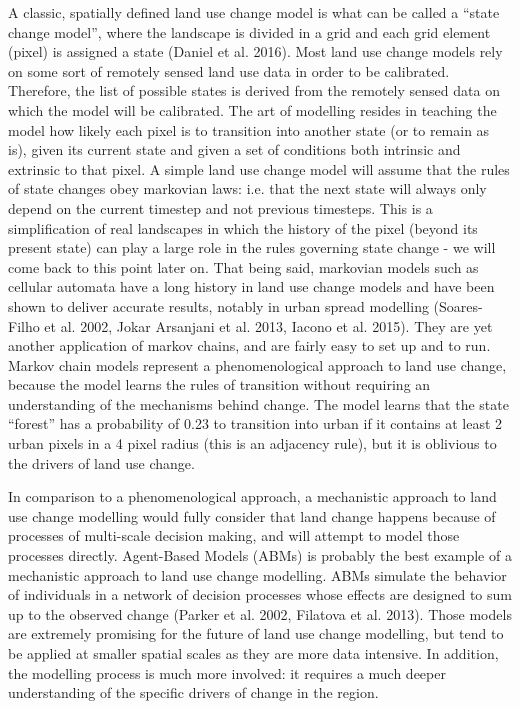 A classic, spatially defined land use change model is what can be called a “state change model”, where the landscape is divided in a grid and each grid element (pixel) is assigned a state (Daniel et al. 2016). Most land use change models rely on some sort of remotely sensed land use data in order to be calibrated. Therefore, the list of possible states is derived from the remotely sensed data on which the model will be calibrated. The art of modelling resides in teaching the model how likely each pixel is to transition into another state (or to remain as is), given its current state and given a set of conditions both intrinsic and extrinsic to that pixel. A simple land use change model will assume that the rules of state changes obey markovian laws: i.e. that the next state will always only depend on the current timestep and not previous timesteps. This is a simplification of real landscapes in which the history of the pixel (beyond its present state) can play a large role in the rules governing state change - we will come back to this point later on. That being said, markovian models such as cellular automata have a long history in land use change models and have been shown to deliver accurate results, notably in urban spread modelling (Soares-Filho et al. 2002, Jokar Arsanjani et al. 2013, Iacono et al. 2015). They are yet another application of markov chains, and are fairly easy to set up and to run. Markov chain models represent a phenomenological approach to land use change, because the model learns the rules of transition without requiring an understanding of the mechanisms behind change. The model learns that the state “forest” has a probability of 0.23 to transition into urban if it contains at least 2 urban pixels in a 4 pixel radius (this is an adjacency rule), but it is oblivious to the drivers of land use change.

In comparison to a phenomenological approach, a mechanistic approach to land use change modelling would fully consider that land change happens because of processes of multi-scale decision making, and will attempt to model those processes directly. Agent-Based Models (ABMs) is probably the best example of a mechanistic approach to land use change modelling. ABMs simulate the behavior of individuals in a network of decision processes whose effects are designed to sum up to the observed change (Parker et al. 2002, Filatova et al. 2013). Those models are extremely promising for the future of land use change modelling, but tend to be applied at smaller spatial scales as they are more data intensive. In addition, the modelling process is much more involved: it requires a much deeper understanding of the specific drivers of change in the region.

